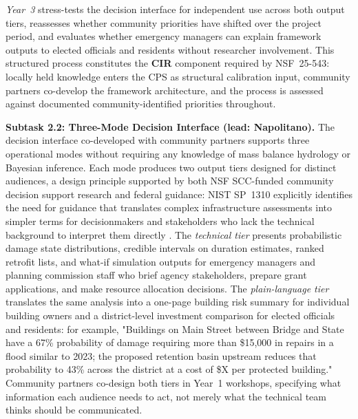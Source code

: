 \documentclass[11pt]{article}
\begin{document}
\textit{Year~3} stress-tests the decision interface for independent use across both
output tiers, reassesses whether community priorities have shifted over the project
period, and evaluates whether emergency managers can explain framework outputs to
elected officials and residents without researcher involvement.
This structured process constitutes the \textbf{CIR} component required by NSF~25-543:
locally held knowledge enters the CPS as structural calibration input, community
partners co-develop the framework architecture, and the process is assessed against
documented community-identified priorities throughout.

\textbf{Subtask 2.2: Three-Mode Decision Interface (lead: Napolitano).}
The decision interface co-developed with community partners supports three operational
modes without requiring any knowledge of mass balance hydrology or Bayesian inference.
Each mode produces two output tiers designed for distinct audiences, a design principle
supported by both NSF SCC-funded community decision support research
\cite{placeholder_scc_twotier} and federal guidance: NIST SP~1310 explicitly identifies
the need for guidance that translates complex infrastructure assessments into simpler
terms for decisionmakers and stakeholders who lack the technical background to interpret
them directly \cite[Sec.~6.1.7.4]{davis2024nist}.
The \textit{technical tier} presents probabilistic damage state distributions,
credible intervals on duration estimates, ranked retrofit lists, and what-if
simulation outputs for emergency managers and planning commission staff who brief
agency stakeholders, prepare grant applications, and make resource allocation
decisions.
The \textit{plain-language tier} translates the same analysis into a one-page
building risk summary for individual building owners and a district-level investment
comparison for elected officials and residents: for example, "Buildings on Main Street
between Bridge and State have a 67\% probability of damage requiring more than
\$15,000 in repairs in a flood similar to 2023; the proposed retention basin upstream
reduces that probability to 43\% across the district at a cost of \$X per protected
building."
Community partners co-design both tiers in Year~1 workshops, specifying what
information each audience needs to act, not merely what the technical team thinks
should be communicated.
\end{document}
